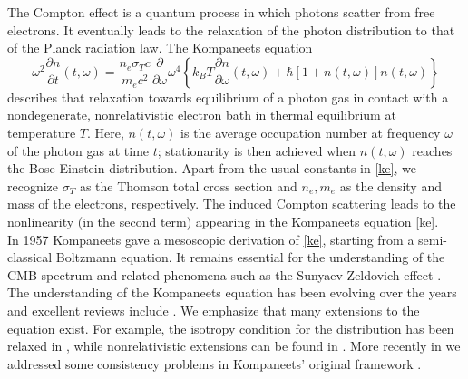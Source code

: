 \documentclass[a4paper,12pt,reqno,superscriptaddress,nofootinbib]{revtex4}
\theoremstyle{plain}
\theoremstyle{definition}
\theoremstyle{remark}
\newcommand{\0}{^{(0)}}
\newcommand{\1}{^{(1)}}
\newcommand{\2}{^{(2)}}
\begin{document}
The Compton effect is a quantum process in which photons scatter from free electrons.  It  eventually  leads to the relaxation of the photon distribution to that of the Planck radiation law.
The Kompaneets equation 
\begin{equation}\label{ke}
	\omega^2\frac{\partial n}{\partial t}(t,\omega)= \frac{n_e\sigma_T 
		c}{m_e c^2}\frac{\partial }{\partial \omega}\omega^4\left\{k_B T 
	\frac{\partial n}{\partial \omega}(t,\omega) + 
	\hbar\left[1+n(t,\omega)\right]n(t,\omega)\right\}
\end{equation}
 describes that relaxation towards equilibrium of a photon gas in contact with a nondegenerate, nonrelativistic electron bath in thermal equilibrium at temperature $T$. Here, $n(t,\omega)$ is the average occupation number  at frequency $\omega$ of the photon gas at time $t$; stationarity is then achieved when $n(t,\omega)$ reaches the Bose-Einstein distribution. Apart from the usual constants in \eqref{ke}, we recognize $\sigma_T$ as the Thomson total cross section and $n_e,m_e$ as the density and mass of the electrons, respectively.  The induced Compton scattering \cite{liedahl, blandford}  leads to the nonlinearity (in the second term) appearing in the Kompaneets equation \eqref{ke}.\\
 In 1957 Kompaneets \cite{kompa} gave a mesoscopic derivation of \eqref{ke}, starting from a semi-classical Boltzmann equation. It remains essential for the understanding of the CMB spectrum and related phenomena such as the Sunyaev-Zeldovich effect \cite{sunyaeveffect,sunyaev}.  The understanding of the Kompaneets equation has been evolving over the years and excellent reviews include \cite{practical,gui,zeldovich}. We emphasize that many extensions to the equation exist.  For example, the isotropy condition for the distribution  has been relaxed in \cite{buet, pitrou}, while nonrelativistic extensions can be found in \cite{barbosa, brown, itoh, itoh2, cooper, kohyama1, kohyama2, kohyama3}.  More recently in \cite{paper} we addressed some consistency problems in Kompaneets' original framework \cite{kompa}.\\
\end{document}
